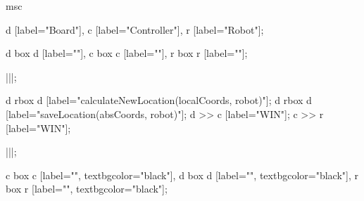 \begin{msc}
msc
{

d [label="Board"],
c [label="Controller"],
r [label="Robot"];


d box d [label=""],
c box c [label=""],
r box r [label=""];


|||;

d rbox d [label="calculateNewLocation(localCoords, robot)"];
d rbox d [label="saveLocation(absCoords, robot)"];
d >> c [label="WIN"];
c >> r [label="WIN"];


|||;

c box c [label="", textbgcolor="black"],
d box d [label="", textbgcolor="black"],
r box r [label="", textbgcolor="black"];

}
\end{msc}
